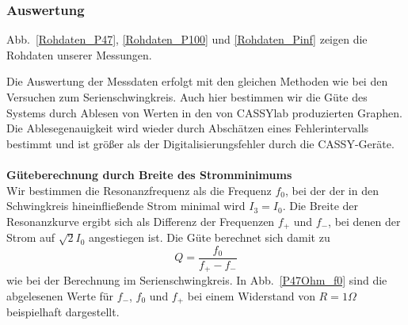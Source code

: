 \documentclass[12pt,a4paper]{article}
\begin{document}
\subsubsection{Auswertung}
Abb.~\ref{Rohdaten_P47}, \ref{Rohdaten_P100} und \ref{Rohdaten_Pinf} zeigen die Rohdaten unserer Messungen.

Die Auswertung der Messdaten erfolgt mit den gleichen Methoden wie bei den Versuchen zum Serienschwingkreis. Auch hier bestimmen wir die Güte des Systems durch Ablesen von Werten in den von CASSYlab produzierten Graphen. Die Ablesegenauigkeit wird wieder durch Abschätzen eines Fehlerintervalls bestimmt und ist größer als der Digitalisierungsfehler durch die CASSY-Geräte.\\
\\
\textbf{Güteberechnung durch Breite des Stromminimums}\\
Wir bestimmen die Resonanzfrequenz als die Frequenz $f_0$, bei der der in den Schwingkreis hineinfließende Strom  minimal wird $I_3=I_0$. Die Breite der Resonanzkurve ergibt sich als Differenz der Frequenzen $f_+$ und $f_-$, bei denen der Strom auf $\sqrt{2}I_0$ angestiegen ist. Die Güte berechnet sich damit zu
\begin{equation}\label{eq:guete_ueber_f}
Q=\frac{f_0}{f_+-f_-}
\end{equation}
wie bei der Berechnung im Serienschwingkreis. In Abb.~\ref{P47Ohm_f0} sind die abgelesenen Werte für $f_-$, $f_0$ und $f_+$ bei einem Widerstand von $R=1\Omega$ beispielhaft dargestellt.
\end{document}
